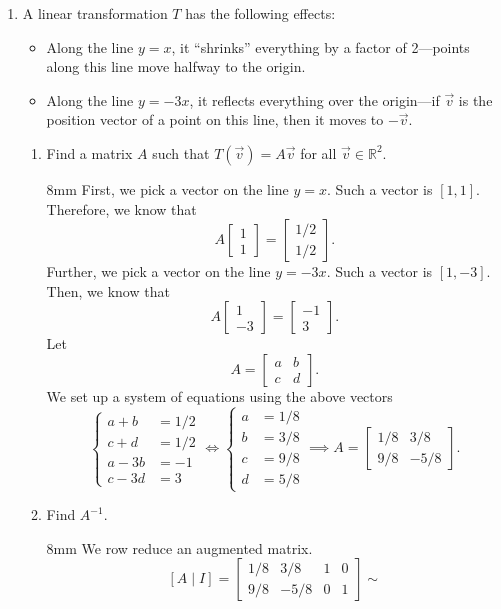 \documentclass[letter]{article}
\newcommand{\R}{\mathbb{R}}
\newcommand{\mat}[1]{\begin{bmatrix}#1\end{bmatrix}}
\newenvironment{answer}{
	\begin{adjustwidth}{8mm}{} \vspace{2mm}}{\end{adjustwidth} \vspace{2mm}
}
\theoremstyle{plain}
\theoremstyle{definition}
\theoremstyle{remark}
\begin{document}
\begin{enumerate}
		\item A linear transformation $T$ has the following effects:
		\begin{itemize}
			\item Along the line $y = x$, it ``shrinks'' everything by a factor of 2---points along this line move halfway to the origin.
			\item Along the line $y=-3x$, it reflects everything over the origin---if $\vec{v}$ is the position vector of a point on this line, then it moves to $-\vec{v}$.
		\end{itemize}
		\begin{enumerate}
			\item Find a matrix $A$ such that $T(\vec{v}) = A\vec{v}$ for all $\vec{v} \in \R^2$.
			\begin{answer}
				First, we pick a vector on the line $y=x$. Such a vector is $[1,1]$. Therefore, we know that 
				\[
				A \mat{1\\1} = \mat{1/2 \\ 1/2}. 
				\]
				Further, we pick a vector on the line $y = -3x$. Such a vector is $[1,-3]$. Then, we know that
				\[
				A \mat{1\\-3} = \mat{-1\\3}.
				\]
				Let
				\[
				A = \mat{a & b \\ c & d}.
				\]
				We set up a system of equations using the above vectors
				\[
				\begin{cases}
					a + b &= 1/2 \\
					c + d &= 1/2 \\
					a - 3b &= -1 \\
					c - 3d &= 3
				\end{cases} \iff
				\begin{cases}
					a &= 1/8 \\
					b &= 3/8 \\
					c &= 9/8 \\
					d &= 5/8
				\end{cases} \implies
				A = \mat{1/8 & 3/8 \\ 9/8 & -5/8}.
				\]
			\end{answer}
			\item Find $A^{-1}$.
			\begin{answer}
			We row reduce an augmented matrix.
			\[
			[A \mid I] = \left[\begin{array}{cc|cc}
				1/8 & 3/8 & 1 & 0 \\
				9/8 & -5/8 & 0 & 1
			\end{array}\right] \sim
\]
\end{answer}
\end{enumerate}
\end{enumerate}
\end{document}
